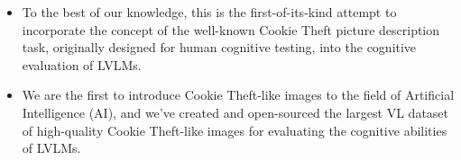 \begin{itemize}
	\item To the best of our knowledge, this is the first-of-its-kind
attempt to incorporate the concept of the well-known Cookie Theft picture description task, originally designed for human cognitive testing, into the cognitive evaluation of LVLMs.
	\item We are the first to introduce Cookie Theft-like images to the field of Artificial Intelligence (AI), and we've created and open-sourced the largest VL dataset of high-quality Cookie Theft-like images for evaluating the cognitive abilities of LVLMs. 




\end{itemize}
